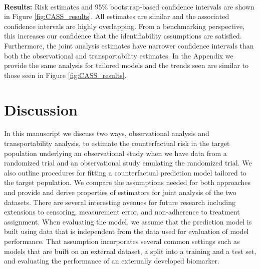 \documentclass[11pt]{article}
\begin{document}
\\
\textbf{Results:} Risk estimates and 95\% bootstrap-based confidence intervals are shown in Figure \ref{fig:CASS_results}.  All estimates are similar and the associated confidence intervals are highly overlapping. From a benchmarking perspective, this increases our confidence that the identifiability assumptions are satisfied. Furthermore, the joint analysis estimates have narrower confidence intervals than both the observational and transportability estimates. In the Appendix we provide the same analysis for tailored models and the trends seen are similar to those seen in Figure \ref{fig:CASS_results}.



\section*{Discussion}

In this manuscript we discuss two ways, observational analysis and transportability analysis, to estimate the counterfactual risk in the target population underlying an observational study when we have data from a randomized trial and an observational study emulating the randomized trial. We also outline procedures for fitting a counterfactual prediction model tailored to the target population. We compare the assumptions needed for both approaches and provide and derive properties of estimators for joint analysis of the two datasets. There are several interesting avenues for future research including extensions to censoring, measurement error, and non-adherence to treatment assignment. When evaluating the model, we assume that the prediction model is built using data that is independent from the data used for evaluation of model performance. That assumption incorporates several common settings such as models that are built on an external dataset, a split into a training and a test set, and evaluating the performance of an externally developed biomarker.
\end{document}
